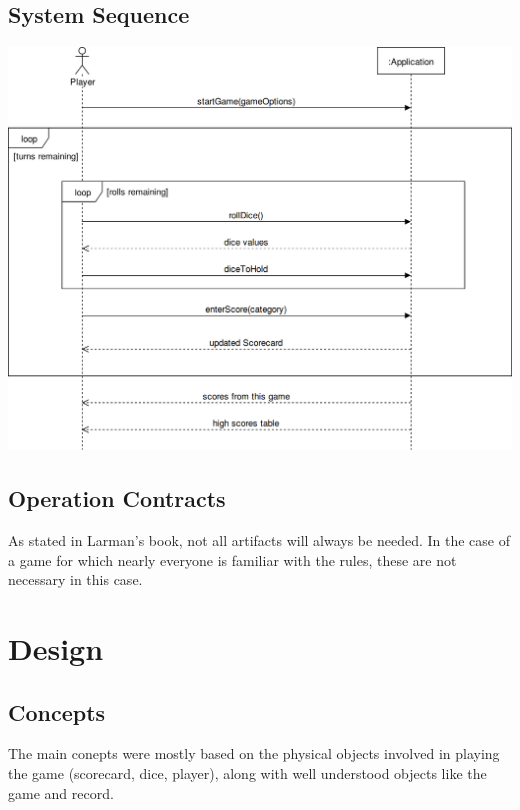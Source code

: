 \documentclass[12pt]{article}
\begin{document}
\subsection*{System Sequence}
\includegraphics[scale=.28]{diagrams/sequence.png}

\newpage
\subsection*{Operation Contracts}
As stated in Larman's book, not all artifacts will always be needed.  In the case of a game for which nearly everyone is familiar with the rules, these are not necessary in this case.

\section*{Design}
\subsection*{Concepts}
The main conepts were mostly based on the physical objects involved in playing the game (scorecard, dice, player), along with well understood objects like the game and record.  \newline \vspace{.2in}
\end{document}
